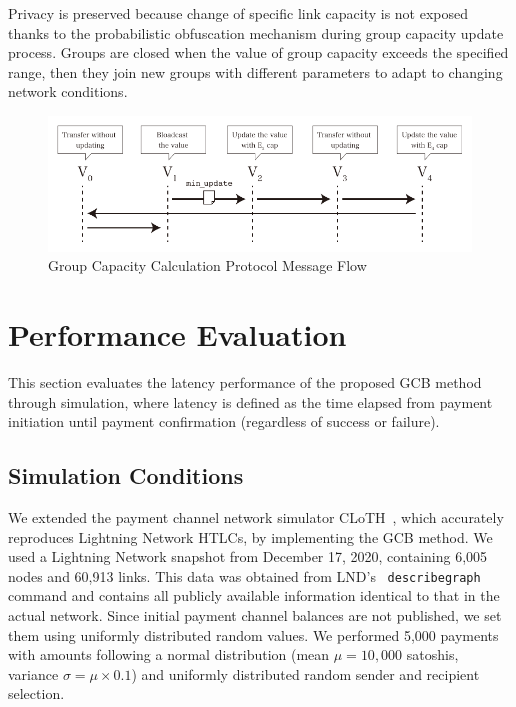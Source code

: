 \documentclass[conference]{IEEEtran}
\begin{document}
Privacy is preserved because change of specific link capacity is not exposed thanks to the probabilistic obfuscation mechanism during group capacity update process.
Groups are closed when the value of group capacity exceeds the specified range, then they join new groups with different parameters to adapt to changing network conditions.

\begin{figure}[htbp]
	\centerline{\includegraphics[width=\linewidth]{fig/group_cap_handover}}
	\caption{Group Capacity Calculation Protocol Message Flow}
	\label{fig:group_cap_handover}
\end{figure}

\section{Performance Evaluation}

This section evaluates the latency performance of the proposed GCB method through simulation, where latency is defined as the time elapsed from payment initiation until payment confirmation (regardless of success or failure).

\subsection{Simulation Conditions}
We extended the payment channel network simulator CLoTH~\cite{CONOSCENTI2021100717}, which accurately reproduces Lightning Network HTLCs, by implementing the GCB method.
We used a Lightning Network snapshot from December 17, 2020, containing 6,005 nodes and 60,913 links.
This data was obtained from LND's~\cite{lnd} \texttt{describegraph} command and contains all publicly available information identical to that in the actual network.
Since initial payment channel balances are not published, we set them using uniformly distributed random values.
We performed 5,000 payments with amounts following a normal distribution (mean $\mu = 10,000$ satoshis, variance $\sigma = \mu \times 0.1$) and uniformly distributed random sender and recipient selection.
\end{document}
